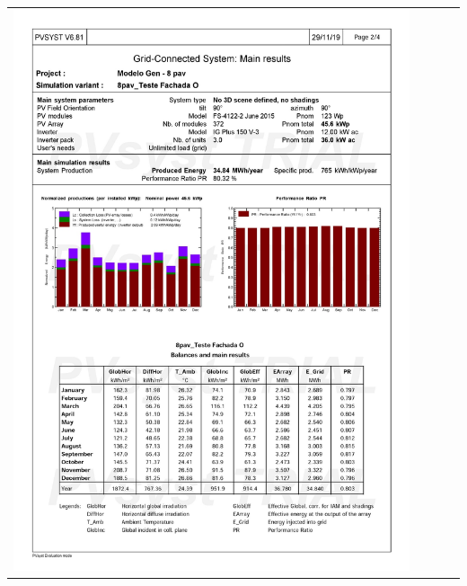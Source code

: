 \begin{table}[H]
    \centering
    \begin{tabular}{l}
        \includegraphics[width=0.9\textwidth]{figures/attachments/resultpv8.jpg}
    \end{tabular}
\end{table}
\pagebreak
